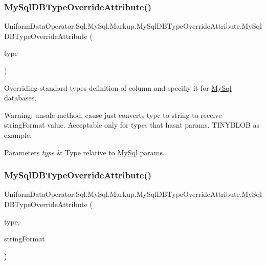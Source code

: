 \subsubsection{\texorpdfstring{My\+Sql\+D\+B\+Type\+Override\+Attribute()}{MySqlDBTypeOverrideAttribute()}\hspace{0.1cm}{\footnotesize\ttfamily [1/2]}}
{\footnotesize\ttfamily Uniform\+Data\+Operator.\+Sql.\+My\+Sql.\+Markup.\+My\+Sql\+D\+B\+Type\+Override\+Attribute.\+My\+Sql\+D\+B\+Type\+Override\+Attribute (\begin{DoxyParamCaption}\item[{My\+Sql\+Db\+Type}]{type }\end{DoxyParamCaption})}



Overriding standard type\textquotesingle{}s definition of column and specifiy it for \mbox{\hyperlink{namespace_uniform_data_operator_1_1_sql_1_1_my_sql}{My\+Sql}} databases. 

Warning\+: unsafe method, cause just converts type to string to receive string\+Format value. Acceptable only for types that hasn\textquotesingle{}t params. T\+I\+N\+Y\+B\+L\+OB as example. 


\begin{DoxyParams}{Parameters}
{\em type} & Type relative to \mbox{\hyperlink{namespace_uniform_data_operator_1_1_sql_1_1_my_sql}{My\+Sql}} params.\\
\hline
\end{DoxyParams}
\mbox{\label{class_uniform_data_operator_1_1_sql_1_1_my_sql_1_1_markup_1_1_my_sql_d_b_type_override_attribute_a192b467574dfb619a19417aafd5150cd}} 
\subsubsection{\texorpdfstring{My\+Sql\+D\+B\+Type\+Override\+Attribute()}{MySqlDBTypeOverrideAttribute()}\hspace{0.1cm}{\footnotesize\ttfamily [2/2]}}
{\footnotesize\ttfamily Uniform\+Data\+Operator.\+Sql.\+My\+Sql.\+Markup.\+My\+Sql\+D\+B\+Type\+Override\+Attribute.\+My\+Sql\+D\+B\+Type\+Override\+Attribute (\begin{DoxyParamCaption}\item[{My\+Sql\+Db\+Type}]{type,  }\item[{string}]{string\+Format }\end{DoxyParamCaption})}



